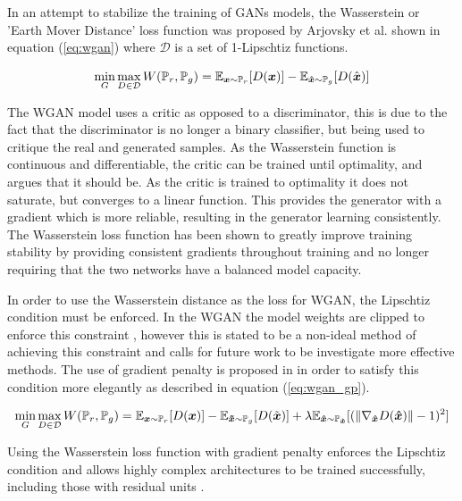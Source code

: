 \documentclass[12pt]{article}
\begin{document}
In an attempt to stabilize the training of GANs models, the Wasserstein or 'Earth Mover Distance' loss function was proposed by Arjovsky et al. \cite{Arjovsky2017} shown in equation (\ref{eq:wgan}) where $\mathcal{D}$ is a set of 1-Lipschtiz functions.

\begin{equation} \label{eq:wgan}
    \min_{G} \max_{D \in \mathcal{D}} W(\mathbb{P}_{r}, \mathbb{P}_{g}) =
            \mathbb{E}_{{\boldsymbol{{x}}} \sim \mathbb{P}_{r}} [D({\boldsymbol{{x}}})]
            -\mathbb{E}_{{\boldsymbol{{\hat{x}}}} \sim \mathbb{P}_{g}} [D(\hat{{\boldsymbol{{x}}}})]
\end{equation}

\noindent The WGAN model uses a critic as opposed to a discriminator, this is due to the fact that the discriminator is no longer a binary classifier, but being used to critique the real and generated samples. 
As the Wasserstein function is continuous and differentiable, the critic can be trained until optimality, and \cite{Arjovsky2017} argues that it should be.
As the critic is trained to optimality it does not saturate, but converges to a linear function.
This provides the generator with a gradient which is more reliable, resulting in the generator learning consistently.
The Wasserstein loss function has been shown to greatly improve training stability by providing consistent gradients throughout training and no longer requiring that the two networks have a balanced model capacity.

In order to use the Wasserstein distance as the loss for WGAN, the Lipschtiz condition must be enforced.
In the WGAN the model weights are clipped to enforce this constraint \cite{Arjovsky2017}, however this is stated to be a non-ideal method of achieving this constraint and calls for future work to be investigate more effective methods.
The use of gradient penalty is proposed in \cite{Gulrajani2017} in order to satisfy this condition more elegantly as described in equation (\ref{eq:wgan_gp}).

\begin{equation} \label{eq:wgan_gp}
    \min_{G} \max_{D \in \mathcal{D}} W(\mathbb{P}_{r}, \mathbb{P}_{g}) 
        = \mathbb{E}_{{\boldsymbol{{x}}} \sim \mathbb{P}_{r}} [D({\boldsymbol{{x}}})]
        - \mathbb{E}_{{\boldsymbol{{\tilde{x}}}} \sim \mathbb{P}_{g}} [D(\tilde{{{\boldsymbol{{x}}}}})]
        + \lambda \mathbb{E}_{{\boldsymbol{{\hat{x}}}} \sim \mathbb{P}_{{\boldsymbol{{\hat{x}}}}}} 
            [(\| \nabla_{{\boldsymbol{{\hat{x}}}}} D({\boldsymbol{{\hat{x}}}}) \| - 1)^2]
\end{equation}

\noindent Using the Wasserstein loss function with gradient penalty enforces the Lipschtiz condition and allows highly complex architectures to be trained successfully, including those with residual units \cite{Gulrajani2017}.
\end{document}
